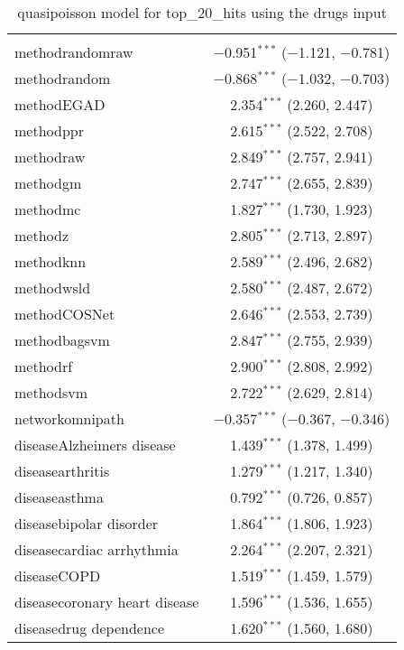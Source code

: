 
\begin{table}[!htbp] \centering 
  \caption{quasipoisson model for top_20_hits using the drugs input} 
  \label{} 
\begin{tabular}{@{\extracolsep{5pt}}lc} 
\\[-1.8ex]\hline 
\hline \\[-1.8ex] 
 methodrandomraw & $-$0.951$^{***}$ ($-$1.121, $-$0.781) \\ 
  methodrandom & $-$0.868$^{***}$ ($-$1.032, $-$0.703) \\ 
  methodEGAD & 2.354$^{***}$ (2.260, 2.447) \\ 
  methodppr & 2.615$^{***}$ (2.522, 2.708) \\ 
  methodraw & 2.849$^{***}$ (2.757, 2.941) \\ 
  methodgm & 2.747$^{***}$ (2.655, 2.839) \\ 
  methodmc & 1.827$^{***}$ (1.730, 1.923) \\ 
  methodz & 2.805$^{***}$ (2.713, 2.897) \\ 
  methodknn & 2.589$^{***}$ (2.496, 2.682) \\ 
  methodwsld & 2.580$^{***}$ (2.487, 2.672) \\ 
  methodCOSNet & 2.646$^{***}$ (2.553, 2.739) \\ 
  methodbagsvm & 2.847$^{***}$ (2.755, 2.939) \\ 
  methodrf & 2.900$^{***}$ (2.808, 2.992) \\ 
  methodsvm & 2.722$^{***}$ (2.629, 2.814) \\ 
  networkomnipath & $-$0.357$^{***}$ ($-$0.367, $-$0.346) \\ 
  diseaseAlzheimers disease & 1.439$^{***}$ (1.378, 1.499) \\ 
  diseasearthritis & 1.279$^{***}$ (1.217, 1.340) \\ 
  diseaseasthma & 0.792$^{***}$ (0.726, 0.857) \\ 
  diseasebipolar disorder & 1.864$^{***}$ (1.806, 1.923) \\ 
  diseasecardiac arrhythmia & 2.264$^{***}$ (2.207, 2.321) \\ 
  diseaseCOPD & 1.519$^{***}$ (1.459, 1.579) \\ 
  diseasecoronary heart disease & 1.596$^{***}$ (1.536, 1.655) \\ 
  diseasedrug dependence & 1.620$^{***}$ (1.560, 1.680) \\ 

\end{tabular}
\end{table}
